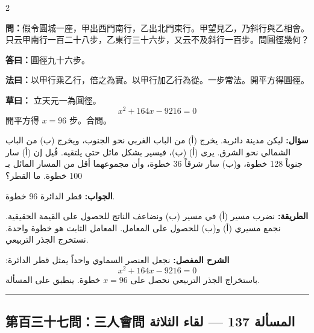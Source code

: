 \documentclass[11pt,a4paper]{article}
\newcommand{\ar}[1]{\arabicfont\beginR #1\endR}
\newcommand{\arb}[1]{\textbf{\arabicfont\beginR #1\endR}}
\newcommand{\longline}{\noindent\rule{\textwidth}{0.4pt}}
\newcommand{\arnote}[1]{\textcolor{arabicblue}{\ar{#1}}}
\newcommand{\wen}[1]{\par\noindent\textbf{\textcolor{probcolor}{問：}}{#1}\par}
\newcommand{\da}[1]{\par\noindent\textbf{\textcolor{anscolor}{答曰：}}{#1}\par}
\newcommand{\fayue}[1]{\par\noindent\textbf{\textcolor{methodcolor}{法曰：}}{#1}\par}
\newcommand{\caoyue}[1]{\par\noindent\textbf{草曰：}{#1}\par}
\newcommand{\arwen}[1]{\par\noindent\arb{سؤال: }\arnote{#1}\par}
\newcommand{\arjwb}[1]{\par\noindent\arb{الجواب: }\arnote{#1}\par}
\newcommand{\arqwd}[1]{\par\noindent\arb{الطريقة: }\arnote{#1}\par}
\newcommand{\arshr}[1]{\par\noindent\arb{الشرح المفصل: }\arnote{#1}\par}
\begin{document}
\begin{paracol}{2}

\begin{leftcolumn}
\wen{假令圓城一座，甲出西門南行，乙出北門東行。甲望見乙，乃斜行與乙相會。只云甲南行一百二十八步，乙東行三十六步，又云不及斜行一百步。問圓徑幾何？}

\da{圓徑九十六步。}

\fayue{以甲行乘乙行，倍之為實。以甲行加乙行為從。一步常法。開平方得圓徑。}

\caoyue{
立天元一為圓徑。
$$x^2 + 164x - 9216 = 0$$
開平方得 $x = 96$ 步。合問。}
\end{leftcolumn}

\begin{rightcolumn}
\arwen{ليكن مدينة دائرية. يخرج (أ) من الباب الغربي نحو الجنوب، ويخرج (ب) من الباب الشمالي نحو الشرق. يرى (أ) (ب)، فيسير بشكل مائل حتى يلتقيه. قُيل إن (أ) سار جنوباً 128 خطوة، و(ب) سار شرقاً 36 خطوة، وأن مجموعهما أقل من المسار المائل بـ 100 خطوة. ما القطر؟}

\arjwb{قطر الدائرة 96 خطوة.}

\arqwd{نضرب مسير (أ) في مسير (ب) ونضاعف الناتج للحصول على القيمة الحقيقية. نجمع مسيري (أ) و(ب) للحصول على المعامل. المعامل الثابت هو خطوة واحدة. نستخرج الجذر التربيعي.}

\arshr{نجعل العنصر السماوي واحداً يمثل قطر الدائرة:
$$x^2 + 164x - 9216 = 0$$
باستخراج الجذر التربيعي نحصل على $x = 96$ خطوة. ينطبق على المسألة.}
\end{rightcolumn}

\end{paracol}

\vspace{0.3cm}
\longline

\subsection*{第百三十七問：三人會問 \hfill \ar{المسألة 137 — لقاء الثلاثة}}
\end{document}
